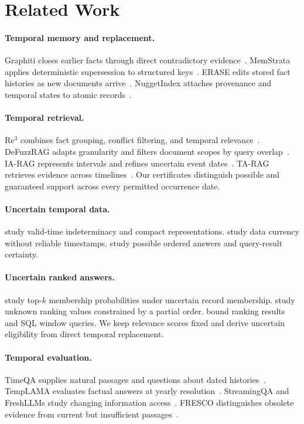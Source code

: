\section{Related Work}
\label{sec:related}

\paragraph{Temporal memory and replacement.}
Graphiti closes earlier facts through direct contradictory evidence~\citep{rasmussen2025zep,graphiti2026source}.
MemStrata applies deterministic supersession to structured keys~\citep{yadav2026memstrata}.
ERASE edits stored fact histories as new documents arrive~\citep{li2025erase}.
NuggetIndex attaches provenance and temporal states to atomic records~\citep{zerhoudi2026nuggetindex}.

\paragraph{Temporal retrieval.}
Re$^3$ combines fact grouping, conflict filtering, and temporal relevance~\citep{cao2026re3}.
DeFuzzRAG adapts granularity and filters document scopes by query overlap~\citep{chen2026defuzzrag}.
IA-RAG represents intervals and refines uncertain event dates~\citep{wang2026iarag}.
TA-RAG retrieves evidence across timelines~\citep{lau2025tarag}.
Our certificates distinguish possible and guaranteed support across every permitted occurrence date.

\paragraph{Uncertain temporal data.}
\citet{anselma2013indeterminacy} study valid-time indeterminacy and compact representations.
\citet{fan2012currency} study data currency without reliable timestamps.
\citet{amarilli2017order} study possible ordered answers and query-result certainty.

\paragraph{Uncertain ranked answers.}
\citet{hua2008ranking} study top-$k$ membership probabilities under uncertain record membership.
\citet{amarilli2017topk} study unknown ranking values constrained by a partial order.
\citet{feng2023ranking} bound ranking results and SQL window queries.
We keep relevance scores fixed and derive uncertain eligibility from direct temporal replacement.

\paragraph{Temporal evaluation.}
TimeQA supplies natural passages and questions about dated histories~\citep{chen2021timeqa}.
TempLAMA evaluates factual answers at yearly resolution~\citep{dhingra2022templama}.
StreamingQA and FreshLLMs study changing information access~\citep{liska2022streamingqa,vu2024freshllms}.
FRESCO distinguishes obsolete evidence from current but insufficient passages~\citep{an2026fresco}.
